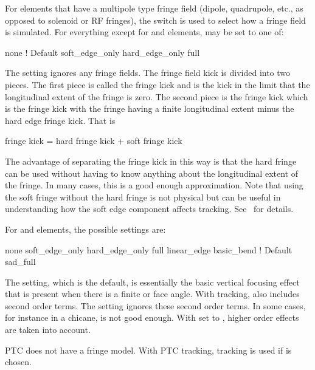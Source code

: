 For elements that have a multipole type fringe field (dipole,
quadrupole, etc., as opposed to solenoid or RF fringes), the
 switch is used to select how a fringe field is
simulated.  For everything except for  and 
elements,  may be set to one of:
\begin{example}
  none              ! Default 
  soft_edge_only
  hard_edge_only
  full
\end{example}
The  setting ignores any fringe fields.
The fringe field kick is divided into two pieces. 
The first piece is called the  fringe kick and is the kick in the limit
that the longitudinal extent of the fringe is zero. The second piece is the 
 fringe kick which is the fringe kick with the fringe having a finite
longitudinal extent minus the hard edge fringe kick. That is
\begin{example}
  fringe kick = hard fringe kick + soft fringe kick
\end{example}
The advantage of separating the fringe kick in this way is that the hard fringe can
be used without having to know anything about the longitudinal extent of the fringe.
In many cases, this is a good enough approximation. Note that using the soft fringe
without the hard fringe is not physical but can be useful in understanding how
the soft edge component affects tracking.
See~ for details.

For  and  elements, the possible 
settings are:
\begin{example}
  none
  soft_edge_only
  hard_edge_only
  full
  linear_edge
  basic_bend        ! Default 
  sad_full
\end{example}
The  setting, which is the default, is essentially the
basic vertical focusing effect that is present when there is a finite
 or  face angle. With  tracking,
 also includes second order terms.  The
 setting ignores these second order terms.  In some
cases, for instance in a chicane,  is not good
enough. With  set to , higher order effects
are taken into account.

PTC does not have a  fringe model.
With PTC tracking,  tracking is used if  is chosen.

